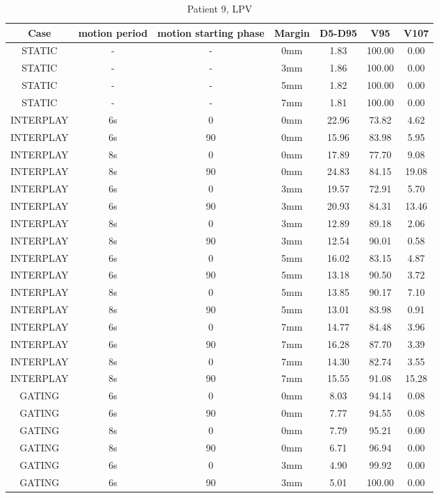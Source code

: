 \begin{table}[H]
  \centering
  \caption{Patient 9, LPV}
  \begin{tabular}{|c||c|c|c||c|c|c|}
    \hline\hline
    Case & motion period & motion starting phase & Margin & D5-D95 & V95 & V107\\
    \hline 
STATIC & - & - & 0mm & 1.83 & 100.00 & 0.00 \\
STATIC & - & - & 3mm & 1.86 & 100.00 & 0.00 \\
STATIC & - & - & 5mm & 1.82 & 100.00 & 0.00 \\
STATIC & - & - & 7mm & 1.81 & 100.00 & 0.00 \\
INTERPLAY & 6s & 0 & 0mm & 22.96 & 73.82 & 4.62 \\
INTERPLAY & 6s & 90 & 0mm & 15.96 & 83.98 & 5.95 \\
INTERPLAY & 8s & 0 & 0mm & 17.89 & 77.70 & 9.08 \\
INTERPLAY & 8s & 90 & 0mm & 24.83 & 84.15 & 19.08 \\
INTERPLAY & 6s & 0 & 3mm & 19.57 & 72.91 & 5.70 \\
INTERPLAY & 6s & 90 & 3mm & 20.93 & 84.31 & 13.46 \\
INTERPLAY & 8s & 0 & 3mm & 12.89 & 89.18 & 2.06 \\
INTERPLAY & 8s & 90 & 3mm & 12.54 & 90.01 & 0.58 \\
INTERPLAY & 6s & 0 & 5mm & 16.02 & 83.15 & 4.87 \\
INTERPLAY & 6s & 90 & 5mm & 13.18 & 90.50 & 3.72 \\
INTERPLAY & 8s & 0 & 5mm & 13.85 & 90.17 & 7.10 \\
INTERPLAY & 8s & 90 & 5mm & 13.01 & 83.98 & 0.91 \\
INTERPLAY & 6s & 0 & 7mm & 14.77 & 84.48 & 3.96 \\
INTERPLAY & 6s & 90 & 7mm & 16.28 & 87.70 & 3.39 \\
INTERPLAY & 8s & 0 & 7mm & 14.30 & 82.74 & 3.55 \\
INTERPLAY & 8s & 90 & 7mm & 15.55 & 91.08 & 15.28 \\
GATING & 6s & 0 & 0mm & 8.03 & 94.14 & 0.08 \\
GATING & 6s & 90 & 0mm & 7.77 & 94.55 & 0.08 \\
GATING & 8s & 0 & 0mm & 7.79 & 95.21 & 0.00 \\
GATING & 8s & 90 & 0mm & 6.71 & 96.94 & 0.00 \\
GATING & 6s & 0 & 3mm & 4.90 & 99.92 & 0.00 \\
GATING & 6s & 90 & 3mm & 5.01 & 100.00 & 0.00 \\

\end{tabular}
\end{table}
